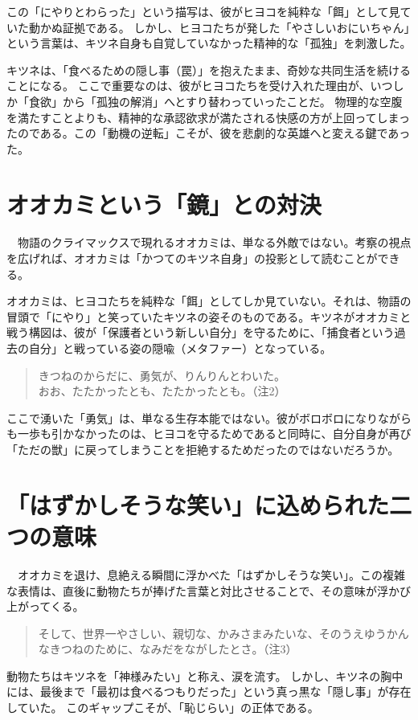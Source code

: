 \documentclass[a4paper,11pt]{ltjsarticle}
\begin{document}
この「にやりとわらった」という描写は、彼がヒヨコを純粋な「餌」として見ていた動かぬ証拠である。
しかし、ヒヨコたちが発した「やさしいおにいちゃん」という言葉は、キツネ自身も自覚していなかった精神的な「孤独」を刺激した。

キツネは、「食べるための隠し事（罠）」を抱えたまま、奇妙な共同生活を続けることになる。
ここで重要なのは、彼がヒヨコたちを受け入れた理由が、いつしか「食欲」から「孤独の解消」へとすり替わっていったことだ。
物理的な空腹を満たすことよりも、精神的な承認欲求が満たされる快感の方が上回ってしまったのである。この「動機の逆転」こそが、彼を悲劇的な英雄へと変える鍵であった。

\section{オオカミという「鏡」との対決}
　物語のクライマックスで現れるオオカミは、単なる外敵ではない。考察の視点を広げれば、オオカミは「かつてのキツネ自身」の投影として読むことができる。

オオカミは、ヒヨコたちを純粋な「餌」としてしか見ていない。それは、物語の冒頭で「にやり」と笑っていたキツネの姿そのものである。キツネがオオカミと戦う構図は、彼が「保護者という新しい自分」を守るために、「捕食者という過去の自分」と戦っている姿の隠喩（メタファー）となっている。

\begin{quote}
きつねのからだに、勇気が、りんりんとわいた。\\
おお、たたかったとも、たたかったとも。（注2）
\end{quote}

ここで湧いた「勇気」は、単なる生存本能ではない。彼がボロボロになりながらも一歩も引かなかったのは、ヒヨコを守るためであると同時に、自分自身が再び「ただの獣」に戻ってしまうことを拒絶するためだったのではないだろうか。

\section{「はずかしそうな笑い」に込められた二つの意味}
　オオカミを退け、息絶える瞬間に浮かべた「はずかしそうな笑い」。この複雑な表情は、直後に動物たちが捧げた言葉と対比させることで、その意味が浮かび上がってくる。

\begin{quote}
そして、世界一やさしい、親切な、かみさまみたいな、そのうえゆうかんなきつねのために、なみだをながしたとさ。（注3）
\end{quote}

動物たちはキツネを「神様みたい」と称え、涙を流す。
しかし、キツネの胸中には、最後まで「最初は食べるつもりだった」という真っ黒な「隠し事」が存在していた。
このギャップこそが、「恥じらい」の正体である。
\end{document}
